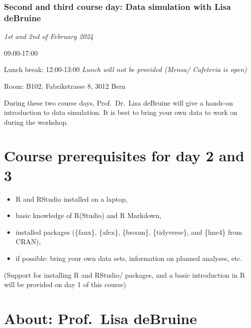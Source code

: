 \documentclass[
  letterpaper,
  DIV=11,
  numbers=noendperiod,
  oneside]{scrreprt}
\begin{document}
\hypertarget{second-and-third-course-day-data-simulation-with-lisa-debruine}{%
\subsubsection*{Second and third course day: Data simulation with Lisa
deBruine}\label{second-and-third-course-day-data-simulation-with-lisa-debruine}}

\emph{1st and 2nd of February 2024}

09:00-17:00

Lunch break: 12:00-13:00 \emph{Lunch will not be provided (Mensa/
Cafeteria is open)}

Room: B102, Fabrikstrasse 8, 3012 Bern

During these two course days, Prof.~Dr.~Lisa deBruine will give a
hands-on introduction to data simulation. It is best to bring your own
data to work on during the workshop.

\hypertarget{course-prerequisites-for-day-2-and-3}{%
\section*{Course prerequisites for day 2 and
3}\label{course-prerequisites-for-day-2-and-3}}


\begin{itemize}
\item
  R and RStudio installed on a laptop,
\item
  basic knowledge of R(Studio) and R Markdown,
\item
  installed packages (\{faux\}, \{afex\}, \{broom\}, \{tidyverse\}, and
  \{lme4\} from CRAN),
\item
  if possible: bring your own data sets, information on planned
  analyses, etc.
\end{itemize}

(Support for installing R and RStudio/ packages, and a basic
introduction in R will be provided on day 1 of this course)

\hypertarget{about-prof.-lisa-debruine}{%
\section*{About: Prof.~Lisa deBruine}\label{about-prof.-lisa-debruine}}
\end{document}
